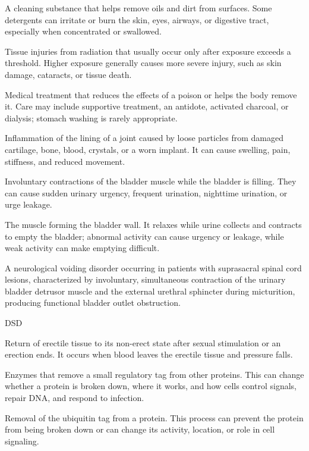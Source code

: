  A cleaning substance that helps remove oils and dirt from surfaces. Some detergents can irritate or burn the skin, eyes, airways, or digestive tract, especially when concentrated or swallowed.

 Tissue injuries from radiation that usually occur only after exposure exceeds a threshold. Higher exposure generally causes more severe injury, such as skin damage, cataracts, or tissue death.

 Medical treatment that reduces the effects of a poison or helps the body remove it. Care may include supportive treatment, an antidote, activated charcoal, or dialysis; stomach washing is rarely appropriate.

 Inflammation of the lining of a joint caused by loose particles from damaged cartilage, bone, blood, crystals, or a worn implant. It can cause swelling, pain, stiffness, and reduced movement.

 Involuntary contractions of the bladder muscle while the bladder is filling. They can cause sudden urinary urgency, frequent urination, nighttime urination, or urge leakage.

 The muscle forming the bladder wall. It relaxes while urine collects and contracts to empty the bladder; abnormal activity can cause urgency or leakage, while weak activity can make emptying difficult.

 A neurological voiding disorder occurring in patients with suprasacral spinal cord lesions, characterized by involuntary, simultaneous contraction of the urinary bladder detrusor muscle and the external urethral sphincter during micturition, producing functional bladder outlet obstruction.

\synonyms
DSD

 Return of erectile tissue to its non-erect state after sexual stimulation or an erection ends. It occurs when blood leaves the erectile tissue and pressure falls.

 Enzymes that remove a small regulatory tag from other proteins. This can change whether a protein is broken down, where it works, and how cells control signals, repair DNA, and respond to infection.

 Removal of the ubiquitin tag from a protein. This process can prevent the protein from being broken down or can change its activity, location, or role in cell signaling.


